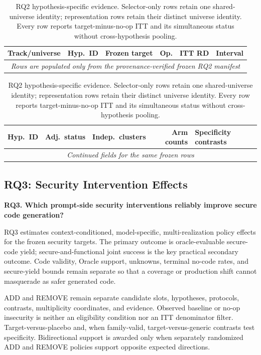 \begin{table}[H]
  \centering
  \small
  \caption{RQ2 hypothesis-specific evidence. Selector-only rows retain one
  shared-universe identity; representation rows retain their distinct universe
  identity. Every row reports target-minus-no-op ITT and its simultaneous
  status without cross-hypothesis pooling.}
  \label{tab:rq2-evidence}
  \begin{tabular}{llllrr}
    \toprule
    Track/universe & Hyp.\ ID & Frozen target & Op. & ITT RD & Interval \\
    \midrule
    \multicolumn{6}{c}{\emph{Rows are populated only from the
    provenance-verified frozen RQ2 manifest}} \\
    \bottomrule
  \end{tabular}

  \medskip
  \begin{tabular}{llrrl}
    \toprule
    Hyp.\ ID & Adj.\ status & Indep.\ clusters & Arm counts & Specificity contrasts \\
    \midrule
    \multicolumn{5}{c}{\emph{Continued fields for the same frozen rows}} \\
    \bottomrule
  \end{tabular}
\end{table}

\subsection{RQ3: Security Intervention Effects}

\textbf{RQ3. Which prompt-side security interventions reliably improve secure
code generation?}

RQ3 estimates context-conditioned, model-specific, multi-realization policy
effects for the frozen security targets. The primary outcome is
oracle-evaluable secure-code yield; secure-and-functional joint success is the
key practical secondary outcome. Code validity, Oracle support, unknowns,
terminal no-code rates, and secure-yield bounds remain separate so that a
coverage or production shift cannot masquerade as safer generated code.

ADD and REMOVE remain separate candidate slots, hypotheses, protocols,
contrasts, multiplicity coordinates, and evidence. Observed baseline or no-op
insecurity is neither an eligibility condition nor an ITT denominator filter.
Target-versus-placebo and, when family-valid, target-versus-generic contrasts
test specificity. Bidirectional support is awarded only when separately
randomized ADD and REMOVE policies support opposite expected directions.


